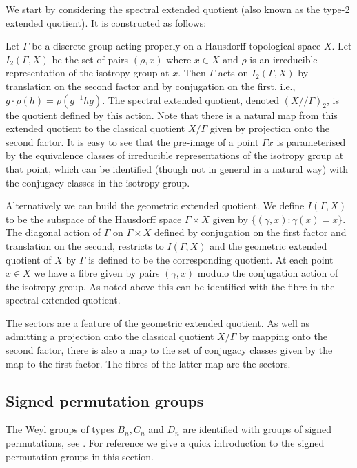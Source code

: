 \documentclass[11pt,a4paper]{article}
\let\mid=:
\def\q {{/\!/}}
\begin{document}
We start by considering the spectral extended quotient (also known as the type-2 extended  quotient). It is constructed as follows:

Let $\Gamma$ be a discrete group acting properly on a Hausdorff topological space $X$. Let $I_2(\Gamma,X)$ be the set of pairs $(\rho, x)$ where $x\in X$ and $\rho$ is an irreducible representation of the isotropy group at $x$. Then $\Gamma$ acts on  $I_2(\Gamma,X)$ by translation on the second factor and by conjugation on the first, i.e., $g\cdot \rho(h) = \rho(g^{-1}hg)$. The spectral extended quotient, denoted $(X\q \Gamma)_2$,  is the quotient defined by this action. Note that there is a natural map from this extended quotient to the classical quotient $X/\Gamma$ given by projection onto the second factor. It is easy to see that the pre-image of a point $\Gamma x$ is parameterised by the equivalence classes of irreducible representations of the isotropy group at that point, which can be identified (though not in general in a natural way) with the conjugacy classes in the isotropy group. 

Alternatively we can build the geometric extended quotient. We define $I(\Gamma,X)$ to be the subspace of the Hausdorff space $\Gamma\times X$ given by  $\{(\gamma,x)\mid \gamma(x)=x\}$. The diagonal  action of $\Gamma$ on $\Gamma\times X$ defined by conjugation on the first factor and translation on the second, restricts to $I(\Gamma,X)$ and the geometric extended quotient of $X$ by $\Gamma$ is defined to be the corresponding quotient. At each point $x\in X$ we have a fibre given by pairs $(\gamma,x)$ modulo the conjugation action of the isotropy group.  As noted above this can be identified with the fibre in the spectral extended quotient.

The sectors are a feature of the geometric extended quotient. As well as admitting a projection onto the classical quotient $X/\Gamma$ by mapping onto the second factor, there is also a map to the set of conjugacy classes given by the map to the first factor.  The fibres of the latter map are the sectors.








\subsection{Signed permutation groups}\label{signed permutations}

The Weyl groups of types $B_n,C_n$ and $D_n$ are identified with groups of signed permutations, see \cite{carter}. For reference we give a quick introduction to the signed permutation groups in this section.
\end{document}
